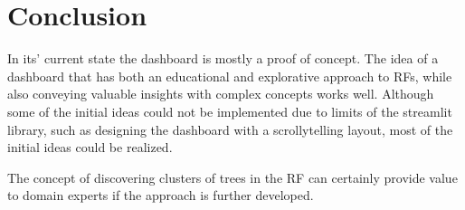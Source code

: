 \documentclass[a4paper, 12pt]{article}
\begin{document}
\clearpage
\section{Conclusion}
In its' current state the dashboard is mostly a proof of concept. The idea of a dashboard that has both
an educational and explorative approach to RFs, while also conveying valuable insights with complex concepts
works well. Although some of the initial ideas could not be implemented due to limits of the streamlit library,
such as designing the dashboard with a scrollytelling layout, most of the initial ideas could be realized. \par
The concept of discovering clusters of trees in the RF can certainly provide value to domain experts if the
approach is further developed.

\clearpage


\end{document}
